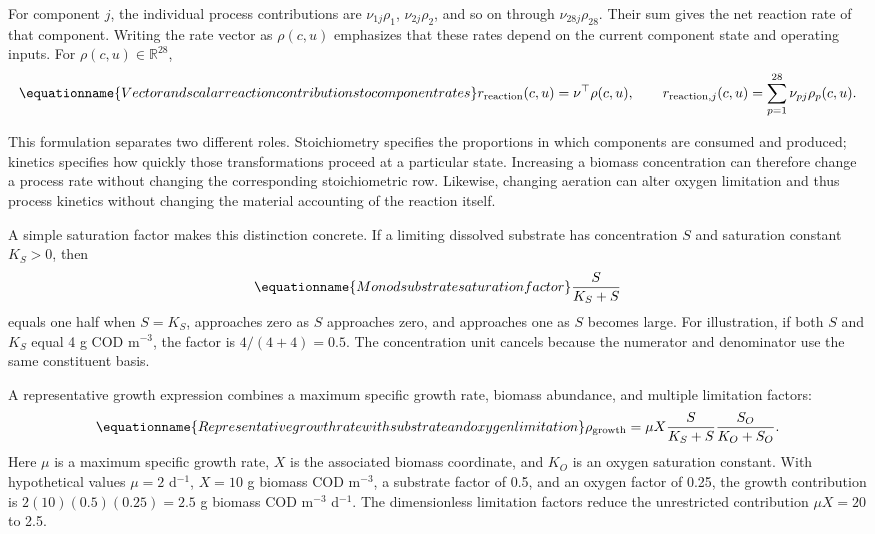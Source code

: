 For component $j$, the individual process contributions are $\nu_{1j}\rho_1$, $\nu_{2j}\rho_2$, and so on through $\nu_{28j}\rho_{28}$. Their sum gives the net reaction rate of that component. Writing the rate vector as $\rho(c,u)$ emphasizes that these rates depend on the current component state and operating inputs. For $\rho(c,u)\in\mathbb{R}^{28}$,
\begin{equation}
\equationname{Vector and scalar reaction contributions to component rates}
r_{\mathrm{reaction}}(c,u)=\nu^\top\rho(c,u),\qquad
r_{\mathrm{reaction},j}(c,u)=\sum_{p=1}^{28}\nu_{pj}\rho_p(c,u).
\label{eq:reaction_contribution}
\end{equation}

This formulation separates two different roles. Stoichiometry specifies the proportions in which components are consumed and produced; kinetics specifies how quickly those transformations proceed at a particular state. Increasing a biomass concentration can therefore change a process rate without changing the corresponding stoichiometric row. Likewise, changing aeration can alter oxygen limitation and thus process kinetics without changing the material accounting of the reaction itself.

A simple saturation factor makes this distinction concrete. If a limiting dissolved substrate has concentration $S$ and saturation constant $K_S>0$, then
\begin{equation}
\equationname{Monod substrate saturation factor}
\frac{S}{K_S+S}
\label{eq:saturation_example}
\end{equation}
equals one half when $S=K_S$, approaches zero as $S$ approaches zero, and approaches one as $S$ becomes large. For illustration, if both $S$ and $K_S$ equal 4 g COD m$^{-3}$, the factor is $4/(4+4)=0.5$. The concentration unit cancels because the numerator and denominator use the same constituent basis.

A representative growth expression combines a maximum specific growth rate, biomass abundance, and multiple limitation factors:
\begin{equation}
\equationname{Representative growth rate with substrate and oxygen limitation}
\rho_{\mathrm{growth}}=
\mu X\frac{S}{K_S+S}\frac{S_O}{K_O+S_O}.
\label{eq:representative_growth}
\end{equation}
Here $\mu$ is a maximum specific growth rate, $X$ is the associated biomass coordinate, and $K_O$ is an oxygen saturation constant. With hypothetical values $\mu=2$ d$^{-1}$, $X=10$ g biomass COD m$^{-3}$, a substrate factor of 0.5, and an oxygen factor of 0.25, the growth contribution is $2(10)(0.5)(0.25)=2.5$ g biomass COD m$^{-3}$ d$^{-1}$. The dimensionless limitation factors reduce the unrestricted contribution $\mu X=20$ to 2.5.

